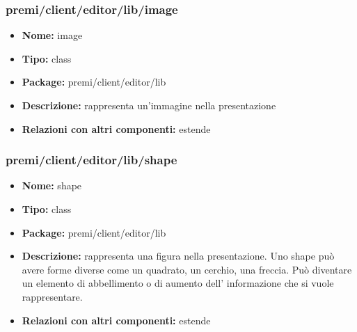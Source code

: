 \subsubsection{premi/client/editor/lib/image}
\begin{itemize}
  \item[] \textbf{Nome:} image
  \item[] \textbf{Tipo:} class
  \item[] \textbf{Package:} premi/client/editor/lib
  \item[] \textbf{Descrizione:} rappresenta un'immagine nella presentazione
  \item[] \textbf{Relazioni con altri componenti:} estende 
\end{itemize}
\subsubsection{premi/client/editor/lib/shape}
\begin{itemize}
  \item[] \textbf{Nome:} shape
  \item[] \textbf{Tipo:} class
  \item[] \textbf{Package:} premi/client/editor/lib
  \item[] \textbf{Descrizione:} rappresenta una figura nella presentazione. Uno shape può avere forme diverse come un quadrato, un cerchio, una freccia. Può diventare un elemento di abbellimento o di aumento dell' informazione che si vuole rappresentare. 
  \item[] \textbf{Relazioni con altri componenti:} estende 
\end{itemize}
